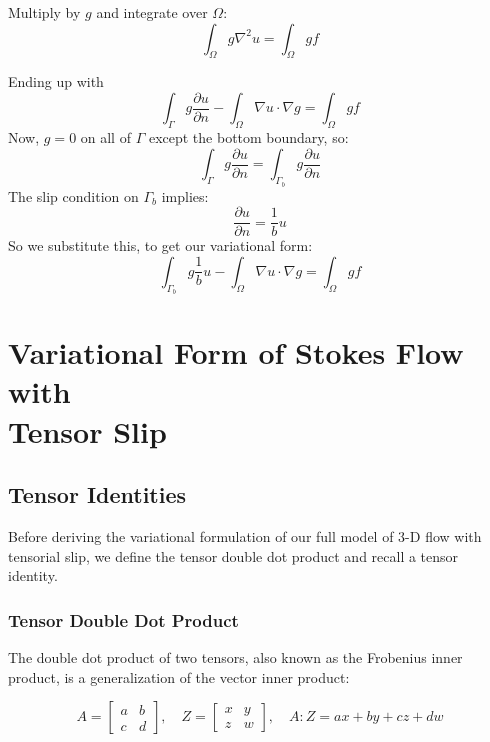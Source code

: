 \documentclass[12pt, a4paper, twoside, openright]{book}
\begin{document}
Multiply  by $g$ and integrate over $\Omega$:
\begin{equation}
\int_{\Omega} g \nabla^2 u = \int_{\Omega} g f
\end{equation}

Ending up with
\begin{equation}
\int_{\Gamma} g \frac{\partial u}{\partial n}
 - \int_{\Omega} \nabla u \cdot \nabla g  
= \int_{\Omega} g f
\end{equation}
Now, $g=0$ on all of $\Gamma$ except the bottom boundary, so:
\begin{equation}
\int_{\Gamma} g \frac{\partial u}{\partial n}
= \int_{\Gamma_b} g \frac{\partial u}{\partial n}
\end{equation}
The slip condition on $\Gamma_b$ implies:
\begin{equation}
\frac{\partial u}{\partial n} = \frac{1}{b}u
\end{equation}
So we substitute this, to get our variational form:
\begin{equation}
\int_{\Gamma_b} g \frac{1}{b} u 
 - \int_{\Omega} \nabla u \cdot \nabla g  
= \int_{\Omega} g f
\end{equation}

\clearpage
\section{Variational Form of Stokes Flow with\\ Tensor Slip}

\subsection{Tensor Identities}

Before deriving the variational formulation of our full model of 3-D flow with tensorial slip, we define the tensor double dot product and recall a tensor identity.

\subsubsection{Tensor Double Dot Product}

The double dot product of two tensors, also known as the Frobenius inner product, is a generalization of the vector inner product:

\begin{equation}
A = 
\begin{bmatrix}
a & b \\
c & d
\end{bmatrix}
, \quad Z = 
\begin{bmatrix}
x & y \\
z & w
\end{bmatrix}
, \quad
A:Z = ax + by + cz + dw
\end{equation}
\end{document}
